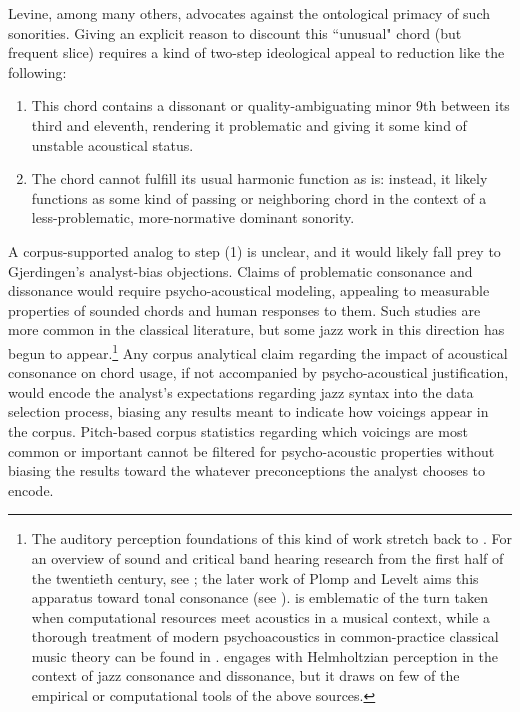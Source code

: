 Levine, among many others, advocates against the ontological primacy of such sonorities.  Giving an explicit reason to discount this ``unusual" chord (but frequent slice) requires a kind of two-step ideological appeal to reduction like the following:
\begin{enumerate}
	\item This chord contains a dissonant or quality-ambiguating minor 9th between its third and eleventh, rendering it problematic and giving it some kind of unstable acoustical status.
	\item The chord cannot fulfill its usual harmonic function as is: instead, it likely functions as some kind of passing or neighboring chord in the context of a less-problematic, more-normative dominant sonority.
\end{enumerate}
A corpus-supported analog to step (1) is unclear, and it would likely fall prey to Gjerdingen's analyst-bias objections.  Claims of problematic consonance and dissonance would require psycho-acoustical modeling, appealing to measurable properties of sounded chords and human responses to them.  Such studies are more common in the classical literature, but some jazz work in this direction has begun to appear.\footnote{The auditory perception foundations of this kind of work stretch back to \cite{helmholtz1863}.  For an overview of sound  and critical band hearing research from the first half of the twentieth century, see \cite{scharf1961}; the later work of Plomp and Levelt aims this apparatus toward tonal consonance (see \cite{plomp1965}).  \cite{longuet1979} is emblematic of the turn taken when computational resources meet acoustics in a musical context, while a thorough treatment of modern psychoacoustics in common-practice classical music theory can be found in \cite{parncutt2012}.  \cite{mcgowan2008} engages with Helmholtzian perception in the context of jazz consonance and dissonance, but it draws on few of the empirical or computational tools of the above sources.}  Any corpus analytical claim regarding the impact of acoustical consonance on chord usage, if not accompanied by psycho-acoustical justification, would encode the analyst's expectations regarding jazz syntax into the data selection process, biasing any results meant to indicate how voicings appear in the corpus.  Pitch-based corpus statistics regarding which voicings are most common or important cannot be filtered for psycho-acoustic properties without biasing the results toward the whatever preconceptions the analyst chooses to encode.

